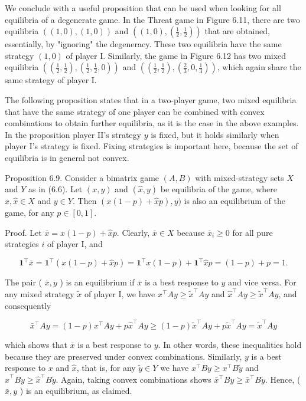 \documentclass[12pt]{article}
\begin{document}
We conclude with a useful proposition that can be used when looking for all equilibria of a degenerate game. In the Threat game in Figure 6.11, there are two equilibria $((1,0),(1,0))$ and $\left((1,0),\left(\frac{1}{2}, \frac{1}{2}\right)\right)$ that are obtained, essentially, by "ignoring" the degeneracy. These two equilibria have the same strategy $(1,0)$ of player I. Similarly, the game in Figure 6.12 has two mixed equilibria $\left(\left(\frac{1}{2}, \frac{1}{2}\right),\left(\frac{1}{2}, \frac{1}{2}, 0\right)\right)$ and $\left(\left(\frac{1}{2}, \frac{1}{2}\right),\left(\frac{2}{3}, 0, \frac{1}{3}\right)\right)$, which again share the same strategy of player I.

The following proposition states that in a two-player game, two mixed equilibria that have the same strategy of one player can be combined with convex combinations to obtain further equilibria, as it is the case in the above examples. In the proposition player II's strategy $y$ is fixed, but it holds similarly when player I's strategy is fixed. Fixing strategies is important here, because the set of equilibria is in general not convex.

Proposition 6.9. Consider a bimatrix game $(A, B)$ with mixed-strategy sets $X$ and $Y$ as in (6.6). Let $(x, y)$ and $(\hat{x}, y)$ be equilibria of the game, where $x, \hat{x} \in X$ and $y \in Y$. Then $(x(1-p)+\hat{x} p), y)$ is also an equilibrium of the game, for any $p \in[0,1]$.

Proof. Let $\bar{x}=x(1-p)+\hat{x} p$. Clearly, $\bar{x} \in X$ because $\bar{x}_{i} \geq 0$ for all pure strategies $i$ of player I, and


\begin{equation*}
\mathbf{1}^{\top} \bar{x}=\mathbf{1}^{\top}(x(1-p)+\hat{x} p)=\mathbf{1}^{\top} x(1-p)+\mathbf{1}^{\top} \hat{x} p=(1-p)+p=1 . \tag{6.23}
\end{equation*}


The pair ( $\bar{x}, y$ ) is an equilibrium if $\bar{x}$ is a best response to $y$ and vice versa. For any mixed strategy $\tilde{x}$ of player I, we have $x^{\top} A y \geq \tilde{x}^{\top} A y$ and $\hat{x}^{\top} A y \geq \tilde{x}^{\top} A y$, and consequently

$$
\bar{x}^{\top} A y=(1-p) x^{\top} A y+p \hat{x}^{\top} A y \geq(1-p) \tilde{x}^{\top} A y+p \tilde{x}^{\top} A y=\tilde{x}^{\top} A y
$$

which shows that $\bar{x}$ is a best response to $y$. In other words, these inequalities hold because they are preserved under convex combinations. Similarly, $y$ is a best response to $x$ and $\hat{x}$, that is, for any $\tilde{y} \in Y$ we have $x^{\top} B y \geq x^{\top} B \tilde{y}$ and $\hat{x}^{\top} B y \geq \hat{x}^{\top} B \tilde{y}$. Again, taking convex combinations shows $\bar{x}^{\top} B y \geq \bar{x}^{\top} B \tilde{y}$. Hence, ( $\bar{x}, y$ ) is an equilibrium, as claimed.
\end{document}
